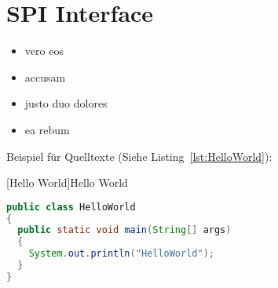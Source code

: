 \section{SPI Interface}
\label{sec:SoTA:second}

\begin{itemize}
\item vero eos
\item accusam
\item justo duo dolores
\item ea rebum
\end{itemize}


Beispiel für Quelltexte (Siehe Listing~\ref{lst:HelloWorld}):

\begin{minipage}{\textwidth}
  [Hello World]{Hello World \cite{coder.2009}} %
  \vspace{-3pt}
  \begin{lstlisting}[language=java,label=lst:HelloWorld]
public class HelloWorld
{
  public static void main(String[] args)
  {
    System.out.println("HelloWorld");
  }
}
  \end{lstlisting}
\end{minipage}